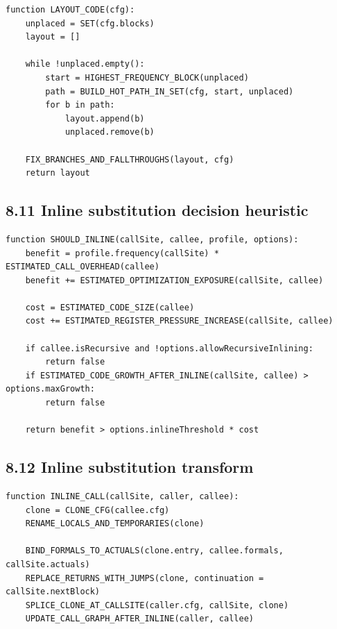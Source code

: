 \documentclass[10pt,letterpaper]{article}
\begin{document}
\begin{verbatim}
function LAYOUT_CODE(cfg):
    unplaced = SET(cfg.blocks)
    layout = []

    while !unplaced.empty():
        start = HIGHEST_FREQUENCY_BLOCK(unplaced)
        path = BUILD_HOT_PATH_IN_SET(cfg, start, unplaced)
        for b in path:
            layout.append(b)
            unplaced.remove(b)

    FIX_BRANCHES_AND_FALLTHROUGHS(layout, cfg)
    return layout
\end{verbatim}

\subsection*{8.11 Inline substitution decision heuristic}
{}

\begin{verbatim}
function SHOULD_INLINE(callSite, callee, profile, options):
    benefit = profile.frequency(callSite) * ESTIMATED_CALL_OVERHEAD(callee)
    benefit += ESTIMATED_OPTIMIZATION_EXPOSURE(callSite, callee)

    cost = ESTIMATED_CODE_SIZE(callee)
    cost += ESTIMATED_REGISTER_PRESSURE_INCREASE(callSite, callee)

    if callee.isRecursive and !options.allowRecursiveInlining:
        return false
    if ESTIMATED_CODE_GROWTH_AFTER_INLINE(callSite, callee) > options.maxGrowth:
        return false

    return benefit > options.inlineThreshold * cost
\end{verbatim}

\subsection*{8.12 Inline substitution transform}
{}

\begin{verbatim}
function INLINE_CALL(callSite, caller, callee):
    clone = CLONE_CFG(callee.cfg)
    RENAME_LOCALS_AND_TEMPORARIES(clone)

    BIND_FORMALS_TO_ACTUALS(clone.entry, callee.formals, callSite.actuals)
    REPLACE_RETURNS_WITH_JUMPS(clone, continuation = callSite.nextBlock)
    SPLICE_CLONE_AT_CALLSITE(caller.cfg, callSite, clone)
    UPDATE_CALL_GRAPH_AFTER_INLINE(caller, callee)
\end{verbatim}
\end{document}
